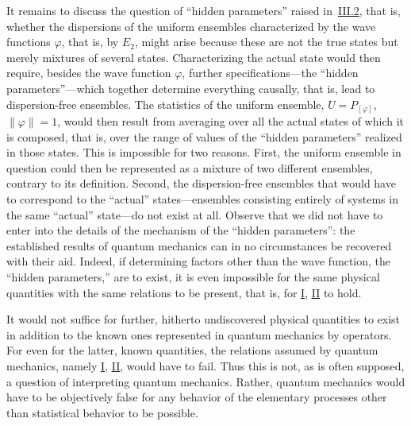 \documentclass[fontsize=13pt,twoside,openany,headings=normal,parskip=false,bookmarkpackage=false,DIV=calc]{scrbook}
\begin{document}
It remains to discuss the question of ``hidden parameters'' raised in~\hyperref[sec:III.2]{III.2}, that is, whether the dispersions of
\hypertarget{origpage-171}{}%
the uniform ensembles characterized by the wave functions $\varphi$, that is, by \hyperref[eq:IV.2.E2]{$E_2$}, might arise because these are not the true states but merely mixtures of several states. Characterizing the actual state would then require, besides the wave function $\varphi$, further specifications---the ``hidden parameters''---which together determine everything causally, that is, lead to dispersion-free ensembles. The statistics of the uniform ensemble, $U=P_{[\varphi]}$, $\|\varphi\|=1$, would then result from averaging over all the actual states of which it is composed, that is, over the range of values of the ``hidden parameters'' realized in those states. This is impossible for two reasons. First, the uniform ensemble in question could then be represented as a mixture of two different ensembles, contrary to its definition. Second, the dispersion-free ensembles that would have to correspond to the ``actual'' states---ensembles consisting entirely of systems in the same ``actual'' state---do not exist at all. Observe that we did not have to enter into the details of the mechanism of the ``hidden parameters'': the established results of quantum mechanics can in no circumstances be recovered with their aid. Indeed, if determining factors other than the wave function, the ``hidden parameters,'' are to exist, it is even impossible for the same physical quantities with the same relations to be present, that is, for \hyperref[cond:IV.2.I]{I}, \hyperref[cond:IV.2.II]{II} to hold.

It would not suffice for further, hitherto undiscovered physical quantities to exist in addition to the known ones represented in quantum mechanics by operators. For even for the latter, known quantities, the relations assumed by quantum mechanics, namely \hyperref[cond:IV.2.I]{I}, \hyperref[cond:IV.2.II]{II}, would have to fail. Thus this is not, as is often supposed, a question of interpreting quantum mechanics. Rather, quantum mechanics would have to be objectively false for any behavior of the elementary processes other than statistical behavior to be possible.
\end{document}
